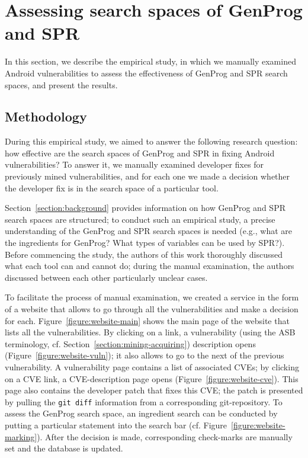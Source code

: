 \section{Assessing search spaces of GenProg and SPR}
\label{section:assessing}

In this section, we describe the empirical study, in which we manually examined \numvuln Android vulnerabilities to assess the effectiveness of GenProg and SPR search spaces, and present the results.

\subsection{Methodology}

During this empirical study, we aimed to answer the following research question: how effective are the search spaces of GenProg and SPR in fixing Android vulnerabilities?
To answer it, we manually examined developer fixes for \numvuln previously mined vulnerabilities, and for each one we made a decision whether the developer fix is in the search space of a particular tool.

Section~\ref{section:background} provides information on how GenProg and SPR search spaces are structured; to conduct such an empirical study, a precise understanding of the GenProg and SPR search spaces is needed (e.g., what are the ingredients for GenProg? What types of variables can be used by SPR?). Before commencing the study, the authors of this work thoroughly discussed what each tool can and cannot do; during the manual examination, the authors discussed between each other particularly unclear cases.

To facilitate the process of manual examination, we created a service in the form of a website that allows to go through all the vulnerabilities and make a decision for each.
Figure~\ref{figure:website-main} shows the main page of the website that lists all the vulnerabilities.
By clicking on a link, a vulnerability (using the ASB terminology, cf. Section~\ref{section:mining-acquiring}) description opens (Figure~\ref{figure:website-vuln}); it also allows to go to the next of the previous vulnerability.
A vulnerability page contains a list of associated CVEs; by clicking on a CVE link, a CVE-description page opens (Figure~\ref{figure:website-cve}).
This page also contains the developer patch that fixes this CVE; the patch is presented by pulling the \texttt{git diff} information from a corresponding git-repository.
To assess the GenProg search space, an ingredient search can be conducted by putting a particular statement into the search bar (cf. Figure~\ref{figure:website-marking}).
After the decision is made, corresponding check-marks are manually set and the database is updated.

